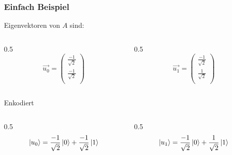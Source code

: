 \begin{frame}
    \frametitle{Einfach Beispiel}


    Eigenvektoren von $A$ sind:    
    \begin{columns}[c]
        \begin{column}{0.5\hsize}\centering
            $$ \vec{u_0} = \begin{pmatrix} \frac{-1}{\sqrt{2}}\\ \frac{-1}{\sqrt{2}}\\ \end{pmatrix}$$
        \end{column}
        \begin{column}{0.5\hsize}
            $$\vec{u_1} = \begin{pmatrix} \frac{-1}{\sqrt{2}}\\ \frac{1}{\sqrt{2}}\\ \end{pmatrix}$$
        \end{column}
    \end{columns}

    \hfil

    \hfil

    Enkodiert
    \begin{columns}[c]
            \begin{column}{0.5\hsize}\centering
                $$ \ket{u_0} = \frac{-1}{\sqrt{2}}\ket{0} + \frac{-1}{\sqrt{2}}\ket{1}$$
            \end{column}
            \begin{column}{0.5\hsize}
                $$\ket{u_1}= \frac{-1}{\sqrt{2}}\ket{0} + \frac{1}{\sqrt{2}}\ket{1}$$
            \end{column}
        \end{columns}
    \end{frame}

